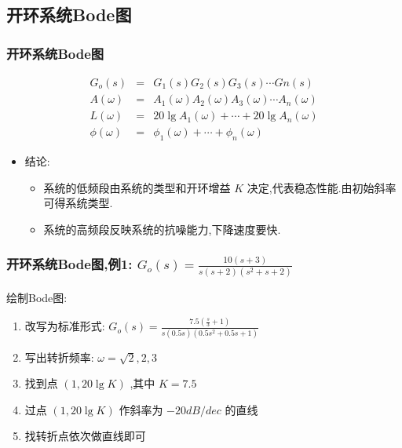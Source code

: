 \documentclass[table]{article}
\begin{document}
\subsection{开环系统Bode图}
\label{sec-3-2}
\begin{frame}
\frametitle{开环系统Bode图}
\label{sec-3-2-1}

\begin{eqnarray*}
G_o(s) &=  &G_1(s)G_2(s)G_3(s)\cdots Gn(s) \\
A(\omega) &=&A_1(\omega)A_2(\omega)A_3(\omega)\cdots A_n(\omega)\\
L(\omega) &=&20\lg A_1(\omega)+\cdots+20\lg A_n(\omega) \\
\phi(\omega) &=& \phi_1(\omega)+\cdots+\phi_n(\omega)
\end{eqnarray*}

\begin{itemize}
\item <2->结论:
\begin{itemize}
\item <2->系统的低频段由系统的类型和开环增益  $K$  决定,代表稳态性能.由初始斜率可得系统类型.
\item <3->系统的高频段反映系统的抗噪能力,下降速度要快.
\end{itemize}
\end{itemize}
\end{frame}
\begin{frame}
\frametitle{开环系统Bode图,例1: $G_o(s)=\frac{10(s+3)}{s(s+2)(s^2+s+2)}$}
\label{sec-3-2-2}

   绘制Bode图:
\begin{enumerate}
\item <2->改写为标准形式:  $G_o(s)=\frac{7.5(\frac{s}{3}+1)}{s(0.5s)(0.5s^2+0.5s+1)}$
\item <3->写出转折频率:  $\omega=\sqrt{2},2,3$
\item <4->找到点  $(1,20\lg K)$  ,其中 $K=7.5$
\item <5->过点  $(1,20\lg K)$  作斜率为  $-20dB/dec$  的直线
\item <6->找转折点依次做直线即可
\end{enumerate}
\end{frame}
\end{document}
